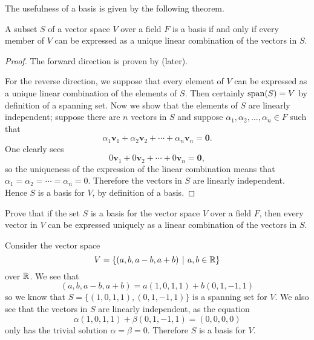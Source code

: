 The usefulness of a basis is given by the following theorem.

\begin{theorem}\label{thrm-basis-iff-has-unique-linear-combinatio}
    A subset $S$ of a vector space $V$ over a field $F$ is a basis if and only if every member of $V$ can be expressed as a unique linear combination of the vectors in $S$.
\end{theorem}
\begin{proof}
    The forward direction is proven by  (later).

    For the reverse direction, we suppose that every element of $V$ can be expressed as a unique linear combination of the elements of $S$. Then certainly $\mathrm{span}(S) = V$ by definition of a spanning set. Now we show that the elements of $S$ are linearly independent; suppose there are $n$ vectors in $S$ and suppose $\alpha_1, \alpha_2, \dots, \alpha_n \in F$ such that
    \[
        \alpha_1\mathbf{v}_1 + \alpha_2\mathbf{v}_2 + \cdots + \alpha_n\mathbf{v}_n = \mathbf{0}.
    \]
    One clearly sees
    \[
        0\mathbf{v}_1 + 0\mathbf{v}_2 + \cdots + 0\mathbf{v}_n = \mathbf{0},
    \]
    so the uniqueness of the expression of the linear combination means that $\alpha_1 = \alpha_2 = \cdots = \alpha_n = 0$. Therefore the vectors in $S$ are linearly independent. Hence $S$ is a basis for $V$, by definition of a basis.
\end{proof}

\begin{exercise}\label{exercise-basis-means-unique-linear-combination}
    Prove that if the set $S$ is a basis for the vector space $V$ over a field $F$, then every vector in $V$ can be expressed uniquely as a linear combination of the vectors in $S$.
\end{exercise}

\begin{example}
    Consider the vector space
    \[
        V = \{(a, b, a-b, a+b) \vert a, b \in \R\}
    \]
    over $\mathbb{R}$. We see that
    \[
        (a, b, a-b, a+b) = a(1, 0, 1, 1) + b(0, 1, -1, 1)
    \]
    so we know that $S = \{(1, 0, 1, 1), (0, 1, -1, 1)\}$ is a spanning set for $V$. We also see that the vectors in $S$ are linearly independent, as the equation
    \[
        \alpha(1, 0, 1, 1) + \beta(0, 1, -1, 1) = (0, 0, 0, 0)
    \]
    only has the trivial solution $\alpha = \beta = 0$. Therefore $S$ is a basis for $V$.
\end{example}

